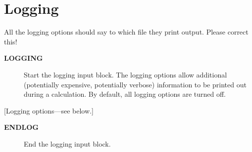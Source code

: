 \documentclass[openany,a4paper,10pt]{manual}
\begin{document}
\resetcurrentobjects


\hypertarget{input-logging}{}\section{Logging}

\begin{notice}[note]
All the logging options should say to which file they print output.  Please correct this!
\end{notice}
\begin{description}
\item[\textbf{LOGGING}]
Start the logging input block.  The logging options allow additional
(potentially expensive, potentially verbose) information to be
printed out during a calculation.  By default, all logging options
are turned off.

\end{description}

{[}Logging options---see below.{]}
\begin{description}
\item[\textbf{ENDLOG}]
End the logging input block.

\end{description}
\end{document}
